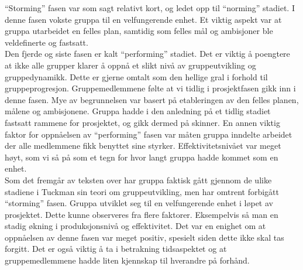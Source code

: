 ``Storming'' fasen var som sagt relativt kort, og ledet opp til ``norming'' stadiet. I denne fasen vokste gruppa til en velfungerende enhet. Et viktig aspekt var at gruppa utarbeidet en felles plan, samtidig som felles mål og ambisjoner ble veldefinerte og fastsatt.\\

Den fjerde og siste fasen er kalt ``performing'' stadiet. Det er viktig å poengtere at ikke alle grupper klarer å oppnå et slikt nivå av gruppeutvikling og gruppedynamikk. Dette er gjerne omtalt som den hellige gral i forhold til gruppeprogresjon. Gruppemedlemmene følte at vi tidlig i prosjektfasen gikk inn i denne fasen. Mye av begrunnelsen var basert på etableringen av den felles planen, målene og ambisjonene. Gruppa hadde i den anledning på et tidlig stadiet fastsatt rammene for prosjektet, og gikk dermed på skinner. En annen viktig faktor for oppnåelsen av ``performing'' fasen var måten gruppa inndelte arbeidet der alle medlemmene fikk benyttet sine styrker. Effektivitetsnivået var meget høyt, som vi så på som et tegn for hvor langt gruppa hadde kommet som en enhet.\\

Som det fremgår av teksten over har gruppa faktisk gått gjennom de ulike stadiene i Tuckman sin teori om gruppeutvikling, men har omtrent forbigått ``storming'' fasen. Gruppa utviklet seg til en velfungerende enhet i løpet av prosjektet. Dette kunne observeres fra flere faktorer. Eksempelvis så man en stadig økning i produksjonsnivå og effektivitet. Det var en enighet om at oppnåelsen av denne fasen var meget positiv, spesielt siden dette ikke skal tas forgitt. Det er også viktig å ta i betrakning tidsaspektet og at gruppemedlemmene hadde liten kjennskap til hverandre på forhånd.\\
